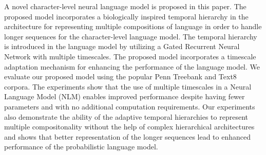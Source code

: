 A novel character-level neural language model is proposed in this paper. The proposed model incorporates a biologically inspired temporal hierarchy in the architecture for representing multiple compositions of language in order to handle longer sequences for the character-level language model. The temporal hierarchy is introduced in the language model by utilizing a Gated Recurrent Neural Network with multiple timescales. The proposed model incorporates a timescale adaptation mechanism for enhancing the performance of the language model. We evaluate our proposed model using the popular Penn Treebank and Text8 corpora. The experiments show that the use of multiple timescales in a Neural Language Model (NLM) enables improved performance despite having fewer parameters and with no additional computation requirements. Our experiments also demonstrate the ability of the adaptive temporal hierarchies to represent multiple compositonality without the help of complex hierarchical architectures and shows that better representation of the longer sequences lead to enhanced performance of the probabilistic language model.
